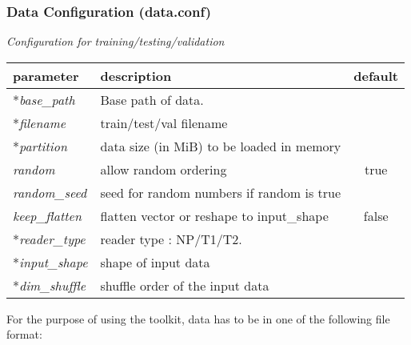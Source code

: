 \subsubsection{Data Configuration (data.conf)}
\begin{table}[!htbp]
\begin{center}
  \medskip  \small \textit{Configuration for training/testing/validation}
   \begin{tabular}{|l|p{8cm}|c|} \hline
   	\textbf{parameter} & \textbf{description} & \textbf{default}\\  \hline
 	*\emph{base\_path} & Base path of data. &  \\  \hline
   	*\emph{filename} &  train/test/val filename & \\  \hline
	*\emph{partition} & data size (in MiB) to be loaded in memory & \\  \hline
	\emph{random} & allow random ordering  & true \\  \hline
	\emph{random\_seed} & seed for random numbers if random is true & \\  \hline 
	\emph{keep\_flatten} & flatten vector or reshape to input\_shape & false \\  \hline
	*\emph{reader\_type} & reader type : NP/T1/T2. & \\  \hline		
	*\emph{input\_shape} & shape of input data & \\  \hline
	*\emph{dim\_shuffle} &  shuffle order of the input data &  \\ \hline
  \end{tabular}		
\end{center}
\end{table} 
\noindent For the purpose of using the toolkit, data has to be in one of the following file format:
